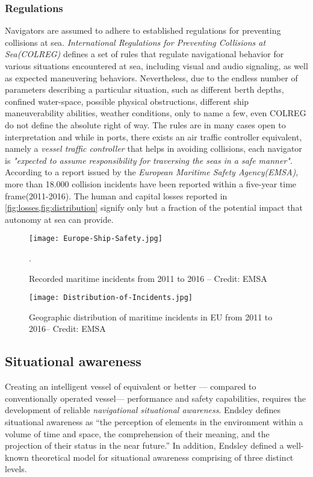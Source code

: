 \subsubsection{Regulations}
Navigators are assumed to adhere to established regulations for preventing collisions at sea. \emph{International Regulations for Preventing Collisions at Sea(COLREG)} defines a set of rules that regulate navigational behavior for various situations encountered at sea, including visual and audio signaling,  as well as expected maneuvering behaviors. Nevertheless, due to the endless number of parameters describing a particular situation, such as different berth depths, confined water-space, possible physical obstructions, different ship maneuverability abilities, weather conditions, only to name a few, even COLREG do not define the absolute right of way. The rules are in many cases open to interpretation and while in ports, there exists an air traffic controller equivalent, namely a \emph{vessel traffic controller} that helps in avoiding collisions, each navigator is \textit{"expected to assume responsibility for traversing the seas in a safe manner"}. According to a report issued by the \emph{European Maritime Safety Agency(EMSA)}, more than 18.000 collision incidents have been reported within a five-year time frame(2011-2016). The human and capital losses reported in \cref{fig:losses,fig:distribution} signify only but a fraction of the potential impact that autonomy at sea can provide.

\begin{figure}[H]
	\centering
	\texttt{[image: Europe-Ship-Safety.jpg]}
	\caption{Recorded maritime incidents from 2011 to 2016 – Credit: EMSA}.
	\label{fig:losses}
\end{figure}


\begin{figure}[H]
	\centering
	\texttt{[image: Distribution-of-Incidents.jpg]}
	\caption{Geographic distribution of maritime incidents in EU from 2011 to 2016– Credit: EMSA}
	\label{fig:distribution}
\end{figure}

\subsection{Situational awareness}
Creating an intelligent vessel of equivalent or better --- compared to conventionally operated vessel--- performance and safety capabilities, requires the development of reliable \emph{navigational situational awareness}. Endsley  \cite{Endsley1995} defines situational awareness as “the perception of elements in the environment within a volume of time and space, the comprehension of their meaning, and the projection of their status in the near future.”  In addition, Endsley defined a well-known theoretical model for situational awareness  \cite{Endsley2001,Endsley1995} comprising of three distinct levels.

